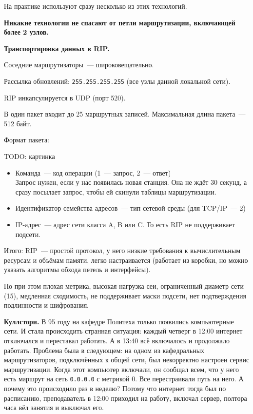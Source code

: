 На практике используют сразу несколько из этих технологий. 

{\bf Никакие технологии не спасают от петли маршрутизации, включающей более 2 узлов.}

{\bf Транспортировка данных в RIP.}

Соседние маршрутизаторы~--- широковещательно.

Рассылка обновлений: {\tt 255.255.255.255} (все узлы данной локальной сети).

RIP инкапсулируется в UDP (порт 520).

В один пакет входит до 25 маршрутных записей. Максимальная длина пакета~--- 512 байт.

Формат пакета:

TODO: картинка

\begin{itemize}
    \item Команда~--- код операции (1~--- запрос, 2~--- ответ)\\
    Запрос нужен, если у нас появилась новая станция. Она не ждёт 30 секунд, а сразу посылает запрос, чтобы ей скинули таблицы маршрутизации.
    \item Идентификатор семейства адресов~--- тип сетевой среды (для TCP/IP~--- 2)
    \item IP-адрес~--- адрес сети класса A, B или C. То есть RIP не поддерживает подсети.
\end{itemize}

Итого: RIP~--- простой протокол, у него низкие требования к вычислительным ресурсам и объёмам памяти, легко настраивается (работает из коробки, но можно указать алгоритмы обхода петель и интерфейсы).

Но при этом плохая метрика, высокая нагрузка сеи, ограниченный диаметр сети (15), медленная сходимость, не поддерживает маски подсети, нет подтверждения подлинности и шифрования.

{\bf Куллстори.} В 95 году на кафедре Политеха только появились компьютерные сети. И стала происходить странная ситуация: каждый четверг в 12:00 интернет отключался и переставал работать. А в 13:40 всё включалось и продолжало работать. Проблема была в следующем: на одном из кафедральных маршрутизаторов, подключённых к общей сети, был некорректно настроен сервис маршрутизации. Когда этот компьютер включали, он сообщал всем, что у него есть маршрут на сеть {\tt 0.0.0.0} с метрикой 0. Все перестраивали путь на него. А почему это происходило раз в неделю? Потому что интернет тогда был по расписанию, преподаватель в 12:00 приходил на работу, включал сервер, полтора часа вёл занятия и выключал его.

